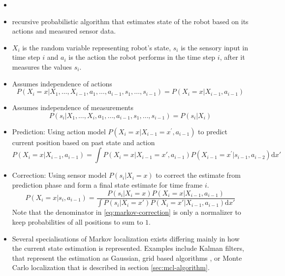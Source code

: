 \begin{itemize}
\item \cite{fox98,diard}
\item recursive probabilistic algorithm that estimates state of the robot based
	on its actions and measured sensor data.
\item \(X_i\) is the random variable representing robot's state,
	\(s_i\) is the sensory input in time step \(i\) and \(a_i\) is the action the
	robot performs in the time step \(i\), after it measures the values \(s_i\).
\item Assumes independence of actions
	\begin{equation}
		P(X_i = x | X_1, \dotsc, X_{i - 1}, a_1, \dotsc, a_{i - 1},
		s_1, \dotsc, s_{i - 1}) = 
		P(X_i = x | X_{i - 1}, a_{i - 1})
	\end{equation}
\item Assumes independence of measurements
	\begin{equation}
		P(s_i | X_1, \dotsc, X_i, a_1, \dotsc, a_{i - 1},
		s_1, \dotsc, s_{i - 1}) = 
		P(s_i | X_i)
	\end{equation}
\item Prediction:
Using action model \(P(X_i = x | X_{i-1} = x^\prime, a_{i - 1})\) to predict
current position based on past state and action
	\begin{equation}
		\label{eq:markov-prediction}
		P(X_i = x | X_{i - 1}, a_{i - 1}) =
		\int
		P(X_i = x | X_{i - 1} = x', a_{i - 1})
		P(X_{i - 1} = x^\prime | s_{i - 1}, a_{i - 2})
		\mathrm{d}x'
	\end{equation}

\item Correction:
Using sensor model \(P(s_i | X_i = x)\) to correct the estimate from prediction phase
and form a final state estimate for time frame \(i\).
	\begin{equation}
	\label{eq:markov-correction}
	P(X_i = x | s_i, a_{i - 1}) =
		\frac
			{P(s_i | X_i = x) P(X_i = x | X_{i - 1}, a_{i - 1})}
			{
			\int
			P(s_i | X_i = x') P(X_i = x' | X_{i - 1}, a_{i - 1})
			\mathrm{d}x'
			}
	\end{equation}
	Note that the denominator in \eqref{eq:markov-correction} is only a normalizer to
	keep probabilities of all positions to sum to \(1\). 
\item Several specialisations of Markov localization exists differing mainly in how the
	current state estimation is represented.
	Examples include Kalman filters, that represent the estimation as Gaussian,
	grid based algorithms \cite{fox98}, or Monte Carlo localization
	that is described in section \ref{sec:mcl-algorithm}.
\end{itemize}

